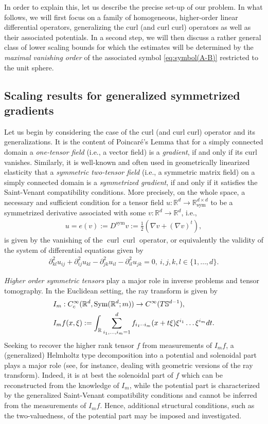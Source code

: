 \documentclass[a4paper, 10pt, twoside, notitlepage]{amsart}
\theoremstyle{plain}
\newcommand{\R}{\mathbb{R}}
\newcommand{\p}{\partial}
\renewcommand{\S}[1]{\textup{Sym}(\R^d;#1)}
\newcommand{\Ds}{D^{\text{sym}}}
\DeclareMathOperator{\curl}{curl}
\begin{document}
	In order to explain this, let us describe the precise set-up of our problem.  In what follows, we will first focus on a family of homogeneous, higher-order linear differential operators,
	generalizing the curl (and curl curl) operators as well as their associated potentials. 
	In a second step, we will then discuss a rather general class of lower scaling bounds for which the estimates will be determined by the \emph{maximal vanishing order} of the associated symbol \cref{eq:symbol(A-B)} restricted to the unit sphere.
	
	
	\subsection{Scaling results for generalized symmetrized gradients}		
	Let us begin by considering the case of the curl (and curl curl) operator and its generalizations. It is the content of Poincar\'e's Lemma that for a simply connected domain a \emph{one-tensor
		field} (i.e., a vector field) is a \emph{gradient}, if and only if its curl vanishes. Similarly, it is well-known and often used in geometrically linearized elasticity that a \emph{symmetric two-tensor
		field} (i.e., a symmetric matrix field) on a simply connected domain is a \emph{symmetrized gradient}, if and only if it satisfies the Saint-Venant compatibility conditions. More precisely, on the
	whole space, a necessary and sufficient condition for a tensor field $u: \R^{d} \to \R^{d \times d}_{\text{sym}}$ to be a symmetrized derivative associated with some $v: \R^d \to \R^d$, i.e.,
	\begin{align*}
		u=e(v):= \Ds v := \frac{1}{2}(\nabla v + (\nabla v)^t),
	\end{align*}
	is given by the vanishing of the $\curl \curl$ operator, or equivalently the validity of the system of differential equations given by
	\begin{align*}
		\p_{kl}^2 u_{ij} + \p_{ij}^2 u_{kl} - \p_{jk}^2 u_{il} - \p_{il}^2 u_{jk} = 0, \ i,j,k,l \in \{1,\dots,d\}.
	\end{align*}
	
	\emph{Higher order symmetric tensors} play a major role in inverse problems and tensor tomography. In the Euclidean setting, the ray transform is given by
	\begin{align*}
          & I_m: C_c^{\infty}(\R^d, \S{m}) \rightarrow C^{\infty}(T \mathbb{S}^{d-1}), \\
          & I_m f(x,\xi):=\int_{\R} \sum_{i_1,\dots,i_m=1}^d  f_{i_1\dotsi i_m}(x + t \xi) \xi^{i_1}\dots \xi^{i_m}  dt.
	\end{align*}
	Seeking to recover the higher rank tensor $f$ from measurements of $I_m f$, a (generalized) Helmholtz type decomposition into a potential and solenoidal part plays a major role (see, for instance, \cite{PSU14,IM19,PSU23, Sha94} dealing with geometric versions of the ray transform). Indeed, it is at best the solenoidal part of $f$ which can be reconstructed from the knowledge of $I_m$, while the potential part is characterized by the generalized Saint-Venant compatibility conditions and cannot be inferred from the measurements of $I_m f$. Hence, additional structural conditions, such as the two-valuedness, of the potential part may be imposed and investigated.
	
\end{document}
